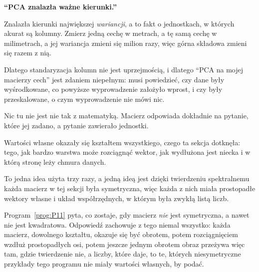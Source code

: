 \begin{trapbox}
\textbf{\enquote{PCA znalazła ważne kierunki.}}

Znalazła kierunki największej \emph{wariancji}, a to fakt o jednostkach, w
których akurat są kolumny. Zmierz jedną cechę w metrach, a tę samą cechę w
milimetrach, a jej wariancja zmieni się milion razy, więc górna składowa
zmieni się razem z nią.

Dlatego standaryzacja kolumn nie jest uprzejmością, i dlatego \enquote{PCA na
mojej macierzy cech} jest zdaniem niepełnym: musi powiedzieć, czy dane były
wyśrodkowane, co powyższe wyprowadzenie założyło wprost, i czy były
przeskalowane, o czym wyprowadzenie nie mówi nic.

Nic tu nie jest nie tak z matematyką. Macierz odpowiada dokładnie na pytanie,
które jej zadano, a pytanie zawierało jednostki.
\end{trapbox}

\begin{fr}
Wartości własne okazały się kształtem wszystkiego, czego ta sekcja dotknęła:
tego, jak bardzo warstwa może rozciągnąć wektor, jak wydłużona jest niecka i w
którą stronę leży chmura danych.

To jedna idea użyta trzy razy, a jedną ideą jest dzięki twierdzeniu
spektralnemu \dash{} każda macierz w tej sekcji była symetryczna, więc każda z
nich miała prostopadłe wektory własne i układ współrzędnych, w którym była
zwykłą listą liczb.

Program~\ref{prog:P11} pyta, co zostaje, gdy macierz \emph{nie} jest
symetryczna, a nawet nie jest kwadratowa. Odpowiedź zachowuje z tego niemal
wszystko: każda macierz, dowolnego kształtu, okazuje się być obrotem, potem
rozciągnięciem wzdłuż prostopadłych osi, potem jeszcze jednym obrotem \dash{}
obraz przeżywa więc tam, gdzie twierdzenie nie, a liczby, które daje, to te,
których niesymetryczne przykłady tego programu nie miały wartości własnych, by
podać.
\end{fr}

